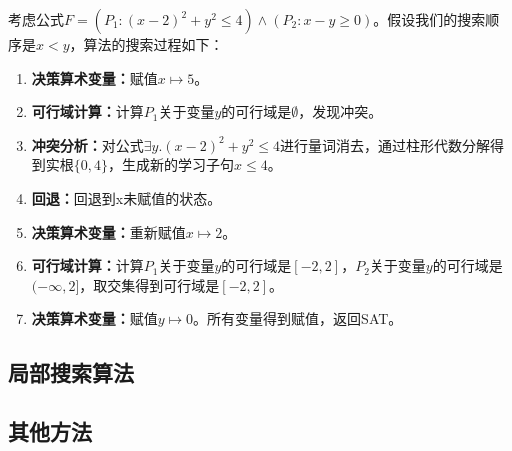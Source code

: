 \begin{example}
考虑公式$F=(P_1: (x-2)^2 + y^2 \le 4) \wedge (P_2: x - y \ge 0)$。假设我们的搜索顺序是$x < y$，算法的搜索过程如下：
\begin{enumerate}
    \item \textbf{决策算术变量：}赋值$x \mapsto 5$。
    \item \textbf{可行域计算：}计算$P_1$关于变量$y$的可行域是$\emptyset$，发现冲突。
    \item \textbf{冲突分析：}对公式$\exists y. (x-2)^2 + y^2 \le 4$进行量词消去，通过柱形代数分解得到实根$\{0, 4\}$，生成新的学习子句$x \le 4$。
    \item \textbf{回退：}回退到x未赋值的状态。
    \item \textbf{决策算术变量：}重新赋值$x \mapsto 2$。
    \item \textbf{可行域计算：}计算$P_1$关于变量$y$的可行域是$[-2, 2]$，$P_2$关于变量$y$的可行域是$(-\infty, 2]$，取交集得到可行域是$[-2, 2]$。
    \item \textbf{决策算术变量：}赋值$y \mapsto 0$。所有变量得到赋值，返回SAT。
\end{enumerate}
\label{ex:nlsat}
\end{example}

\subsection{局部搜索算法}


\subsection{其他方法}






